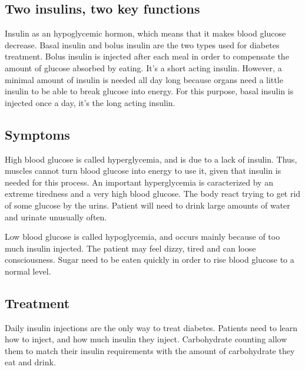 \subsection{Two insulins, two key functions}
Insulin as an hypoglycemic hormon, which means that it makes blood glucose decrease. 
Basal insulin and bolus insulin are the two types used for diabetes treatment. Bolus insulin is injected after each meal in order to compensate the amount of glucose absorbed by eating. It's a short acting insulin. However, a minimal amount of insulin is needed all day long because organs need a little insulin to be able to break glucose into energy. For this purpose, basal insulin is injected once a day, it's the long acting insulin. 

\subsection{Symptoms}
High blood glucose is called hyperglycemia, and is due to a lack of insulin. Thus, muscles cannot turn blood glucose into energy to use it, given that insulin is needed for this process. An important hyperglycemia is caracterized by an extreme tiredness and a very high blood glucose. The body react trying to get rid of some glucose by the urins. Patient will need to drink large amounts of water and urinate unusually often. 

Low blood glucose is called hypoglycemia, and occurs mainly because of too much insulin injected. The patient may feel dizzy, tired and can loose consciousness. Sugar need to be eaten quickly in order to rise blood glucose to a normal level.  

\subsection{Treatment}
Daily insulin injections are the only way to treat diabetes. Patients need to learn how to inject, and how much insulin they inject. Carbohydrate counting allow them to match their insulin requirements with the amount of carbohydrate they eat and drink. 
